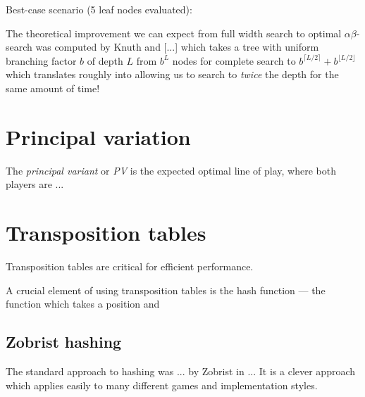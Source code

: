 \documentclass[10pt,dvipdfmx,letterpaper]{report}
\newcommand{\ab}{{$\alpha\beta$}}
\begin{document}
Best-case scenario (5 leaf nodes evaluated):
\iffalse
\begin{center}
\begin{tikzpicture}%
  \tikzstyle{level 1}=[level distance=15mm,sibling distance=35mm]
  \tikzstyle{level 2}=[level distance=15mm,sibling distance=10mm]
  \tikzstyle{maxer}=[rectangle,draw,inner sep=2]
  \tikzstyle{miner}=[circle,draw,inner sep=1]
  \node(0)[maxer]{$=7$}
  child{node[miner]{$=7$}
    child{node{$7$} edge from parent[very thick]}
    child{node{$8$} edge from parent[semithick]}
    child{node{$9$} edge from parent[semithick]}
    edge from parent[very thick]
  }
  child{node[miner]{$\leq4$}
    child{node{$4$} edge from parent[semithick]}
    child{node{$5$} edge from parent[semithick,dashed] node{$=$}}
    child{node{$9$} edge from parent[semithick,dashed] node{$=$}}
  }
  child{node[miner]{$\leq1$}
    child{node{$1$} edge from parent[semithick]}
    child{node{$2$} edge from parent[semithick,dashed] node{$=$}}
    child{node{$9$} edge from parent[semithick,dashed] node{$=$}}
  };
\end{tikzpicture}
\end{center}
\fi

The theoretical improvement we can expect from full width search to optimal \ab-search
was computed by Knuth and [...] which takes a tree with uniform branching
factor $b$ of depth $L$ from $b^L$ nodes for complete search to $b^{\lceil L/2\rceil}+b^{\lfloor L/2\rfloor}$
which translates roughly into allowing us to search to {\em twice} the depth for the same amount of time!

\section{Principal variation}

The {\em principal variant} or {\em PV} is the expected
optimal line of play, where both players are ...

\section{Transposition tables}

Transposition tables are critical for efficient performance.

A crucial element of using transposition tables is the hash function --- the
function which takes a position and 

\subsection{Zobrist hashing}
The standard approach to hashing was ... by Zobrist in ...
It is a clever approach which applies easily to many different games
and implementation styles.
\end{document}
